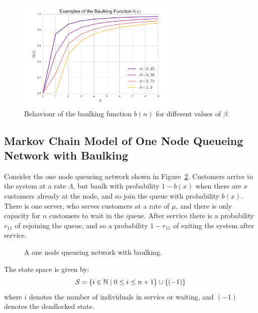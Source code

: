 \documentclass{article}
\begin{document}
\begin{figure}
    \begin{center}
        \includegraphics[width=0.7\textwidth]{img/examplebaulking.pdf}
    \end{center}
    \caption{Behaviour of the baulking function $b(n)$ for different values of $\beta$.}
    \label{fig:examplebaulkingfunctions}
\end{figure}


\subsection{Markov Chain Model of One Node Queueing Network with Baulking}

Consider the one node queueing network shown in Figure~\ref{fig:onenodenetwork_baulking}.
Customers arrive to the system at a rate $\Lambda$, but baulk with probability $1 - b(x)$ when there are $x$ customers already at the node, and so join the queue with probability $b(x)$.
There is one server, who serves customers at a rate of $\mu$, and there is only capacity for $n$ customers to wait in the queue.
After service there is a probability $r_{11}$ of rejoining the queue, and so a probability $1-r_{11}$ of exiting the system after service.

\begin{figure}
    \begin{center}
        
    \end{center}
    \caption{A one node queueing network with baulking.}
    \label{fig:onenodenetwork_baulking}
\end{figure}

The state space is given by:
        \[S = \{i\in\mathbb{N} \nonscript\; | \nonscript\; 0 \leq i \leq n + 1
        \}\cup\{(-1)\}\]
where \(i\) denotes the number of individuals in service or waiting, and $(-1)$ denotes the deadlocked state.
\end{document}
